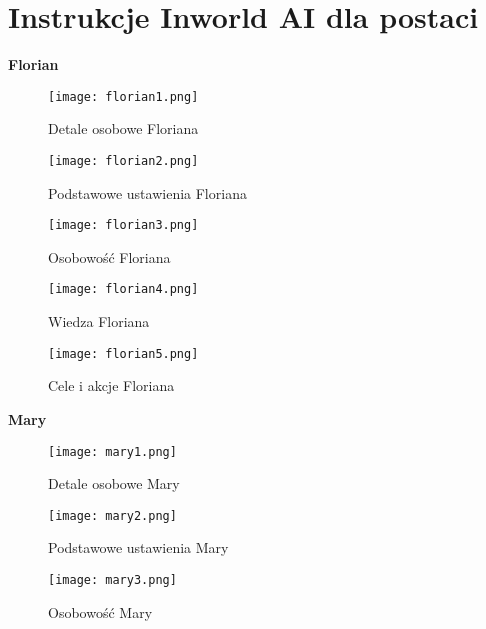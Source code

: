 \graphicspath{{appendices/imgs/}}
\chapter{Instrukcje Inworld AI dla postaci}\label{appendix:A}

\textbf{Florian}

\begin{figure}[h!]
    \centering
    \texttt{[image: florian1.png]}
    \caption{Detale osobowe Floriana}
    \label{fig:app1_florian_1}
\end{figure}

\begin{figure}[h!]
    \centering
    \texttt{[image: florian2.png]}
    \caption{Podstawowe ustawienia Floriana}
    \label{fig:app1_florian_2}
\end{figure}

\begin{figure}[h!]
    \centering
    \texttt{[image: florian3.png]}
    \caption{Osobowość Floriana}
    \label{fig:app1_florian_3}
\end{figure}

\begin{figure}[h!]
    \centering
    \texttt{[image: florian4.png]}
    \caption{Wiedza Floriana}
    \label{fig:app1_florian_4}
\end{figure}

\begin{figure}[h!]
    \centering
    \texttt{[image: florian5.png]}
    \caption{Cele i akcje Floriana}
    \label{fig:app1_florian_5}
\end{figure}

\textbf{Mary}

\begin{figure}[h!]
    \centering
    \texttt{[image: mary1.png]}
    \caption{Detale osobowe Mary}
    \label{fig:app1_mary_1}
\end{figure}

\begin{figure}[h!]
    \centering
    \texttt{[image: mary2.png]}
    \caption{Podstawowe ustawienia Mary}
    \label{fig:app1_mary_2}
\end{figure}

\begin{figure}[h!]
    \centering
    \texttt{[image: mary3.png]}
    \caption{Osobowość Mary}
    \label{fig:app1_mary_3}
\end{figure}

